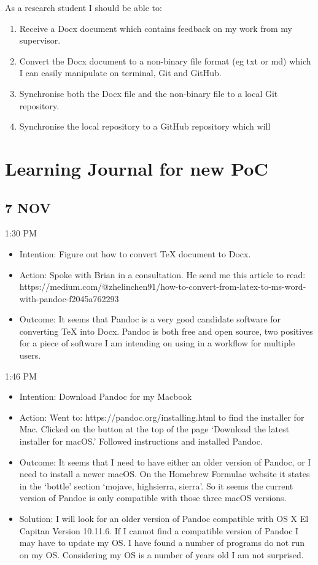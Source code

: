 \documentclass{article}
\begin{document}
As a research student I should be able to:

\begin{enumerate}
    \item Receive a Docx document which contains feedback on my work from my supervisor.
    \item Convert the Docx document to a non-binary file format (eg txt or md) which I can easily manipulate on terminal, Git and GitHub.
    \item Synchronise both the Docx file and the non-binary file to a local Git repository.
    \item Synchronise the local repository to a GitHub repository which will 
\end{enumerate}

\section{Learning Journal for new PoC}

\subsection{7 NOV}

1:30 PM
\begin{itemize}
    \item Intention: Figure out how to convert TeX document to Docx.
    \item Action: Spoke with Brian in a consultation. He send me this article to read: https://medium.com/@zhelin\-chen91/how-to-convert-from-latex-to-ms-word-with-pandoc-f2045a762293
    \item Outcome: It seems that Pandoc is a very good candidate software for converting TeX into Docx. Pandoc is both free and open source, two positives for a piece of software I am intending on using in a workflow for multiple users.
\end{itemize}

1:46 PM
\begin{itemize}
    \item Intention: Download Pandoc for my Macbook
    \item Action: Went to: https://pandoc.org/installing.html to find the installer for Mac. Clicked on the button at the top of the page `Download the latest installer for macOS.' Followed instructions and installed Pandoc. 
    \item Outcome: It seems that I need to have either an older version of Pandoc, or I need to install a newer macOS. On the Homebrew Formulae website it states in the `bottle' section `mojave, high\textunderscore sierra, sierra'. So it seems the current version of Pandoc is only compatible with those three macOS versions.
    \item Solution: I will look for an older version of Pandoc compatible with OS X El Capitan Version 10.11.6. If I cannot find a compatible version of Pandoc I may have to update my OS. I have found a number of programs do not run on my OS. Considering my OS is a number of years old I am not surprised.
\end{itemize}
\end{document}
